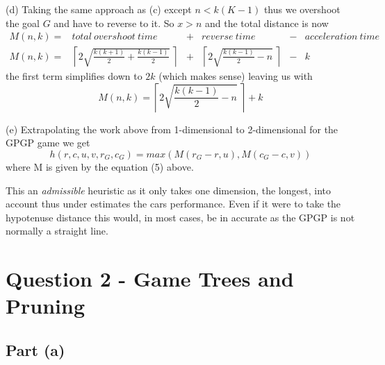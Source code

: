 \documentclass[a4paper,12pt]{article}
\begin{document}
(d) Taking the same approach as (c) except $n <  k (K - 1)$ thus we overshoot the goal $G$ and have to reverse to it. So $x > n$ and the total distance is now
\begin{equation}
	\begin{array}{rlclcl}
	M(n, k) = & total\ overshoot\ time & + & reverse\ time & - & acceleration\ time \\
	M(n, k) = & \left\lceil 2\sqrt{\frac{k(k + 1)}{2} + \frac{k(k - 1)}{2}} \ \right\rceil & + & \left\lceil 2\sqrt{\frac{k(k - 1)}{2} - n} \
\right\rceil & - & k
	\end{array}
\end{equation}
the first term simplifies down to $2k$ (which makes sense) leaving us with
\begin{equation}
	M(n, k) = \left\lceil 2\sqrt{\frac{k(k - 1)}{2} - n} \ \right\rceil + k
\end{equation}


(e) Extrapolating the work above from 1-dimensional to 2-dimensional for the GPGP game we get
\begin{equation}
	h(r,c,u,v,r_G,c_G) = max(M(r_G - r, u), M(c_G - c, v))
\end{equation}
where M is given by the equation (5) above.

This an \emph{admissible} heuristic as it only takes one dimension, the longest, into account thus under estimates the cars performance. Even if it were to take the hypotenuse distance this would, in most cases, be in accurate as the GPGP is not normally a straight line.

\section*{Question 2 - Game Trees and Pruning}


\subsection*{Part (a)}
\end{document}

